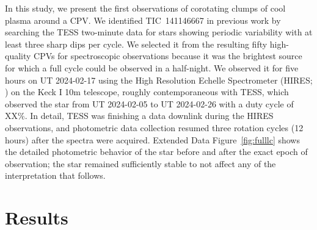 \documentclass{nature3}
\begin{document}
In this study, we present the first observations of corotating clumps
of cool plasma around a CPV.  We identified TIC~141146667 in previous
work \cite{Bouma2024} by searching the TESS two-minute data for stars
showing periodic variability with at least three sharp dips per cycle.
We selected it from the resulting fifty high-quality CPVs for
spectroscopic observations because it was the brightest source for
which a full cycle could be observed in a half-night.  We observed it
for five hours on UT 2024-02-17 using the High Resolution Echelle
Spectrometer (HIRES; \cite{vogt_hires_1994}) on the Keck I 10m
telescope, roughly contemporaneous with TESS, which observed the star
from UT 2024-02-05 to UT 2024-02-26 with a duty cycle of XX\%.  In
detail, TESS was finishing a data downlink during the HIRES
observations, and photometric data collection resumed three rotation
cycles (12 hours) after the spectra were acquired.  Extended Data
Figure~\ref{fig:fulllc} shows the detailed photometric behavior of the
star before and after the exact epoch of observation; the star
remained sufficiently stable to not affect any of the interpretation
that follows.


\section{Results}
\end{document}
